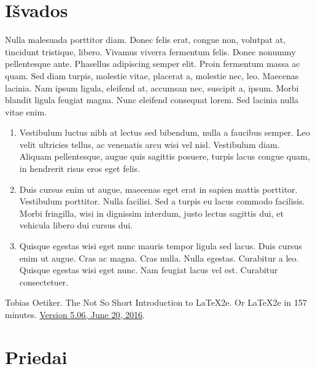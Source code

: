 \documentclass[a4paper, 12pt]{article}
\begin{document}
\section*{Išvados}
{}
%
Nulla malesuada porttitor diam. Donec felis erat, congue non, volutpat at, 
tincidunt tristique, libero. Vivamus viverra fermentum felis. Donec nonummy 
pellentesque ante. Phasellus adipiscing semper elit. Proin fermentum massa ac 
quam. Sed diam turpis, molestie vitae, placerat a, molestie nec, leo. 
Maecenas lacinia. Nam ipsum ligula, eleifend at, accumsan nec, suscipit a, 
ipsum. Morbi blandit ligula feugiat magna. Nunc eleifend consequat lorem. Sed 
lacinia nulla vitae enim. 
%
\begin{enumerate}
  \addtolength{\itemsep}{-0.5\baselineskip} 
  \item Vestibulum luctus nibh at lectus sed bibendum, nulla a faucibus semper. 
        Leo velit ultricies tellus, ac venenatis arcu wisi vel nisl. Vestibulum 
        diam. Aliquam pellentesque, augue quis sagittis posuere, turpis lacus 
        congue quam, in hendrerit risus eros eget felis. 
  \item Duis cursus enim ut augue, maecenas eget erat in sapien mattis porttitor. 
        Vestibulum porttitor. Nulla facilisi. Sed a turpis eu lacus commodo 
        facilisis. Morbi fringilla, wisi in dignissim interdum, justo lectus 
        sagittis dui, et vehicula libero dui cursus dui.
  \item Quisque egestas wisi eget nunc mauris tempor ligula sed lacus. Duis 
        cursus enim ut augue. Cras ac magna. Cras nulla. Nulla egestas. 
        Curabitur a leo. Quisque egestas wisi eget nunc. Nam feugiat lacus vel 
        est. Curabitur consectetuer.
\end{enumerate}
%
%
\newpage
{}


\begin{thebibliography}{99}
Tobias Oetiker. The Not So Short Introduction to \LaTeX2e{}. Or \LaTeX2e{} in 157 
minutes. \href{http://tobi.oetiker.ch/lshort/lshort.pdf}{Version 5.06, June 20, 2016}.
\end{thebibliography}
%
%
\newpage
\appendix
\section{Priedai}
\end{document}
